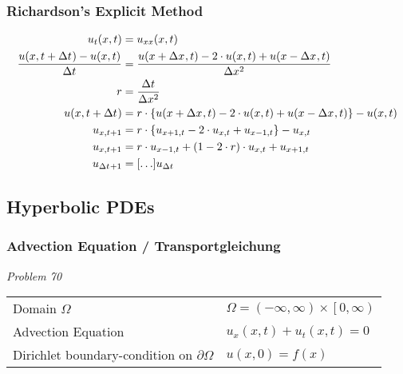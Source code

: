 \documentclass[
	final,
	a4paper,
	oneside,
	parskip=full,
	headings=standardclasses,
	headings=big,
	pointednumbers,
    fleqn
]{scrartcl}
\newcommand{\f}[2]{\frac{#1}{#2}}
\newcommand{\kl}[1]{{\left( #1 \right)}}
\newcommand{\kq}[1]{{\left\{ #1 \right\}}}
\newcommand{\ks}[1]{{\left[ #1 \right]}}
\newcommand{\dom}{{\Omega}}
\newcommand{\bound}{{\partial \Omega}}
\begin{document}
    \subsubsection*{Richardson's Explicit Method}
    
    \begin{align*}
        u_{t}\kl{x,t}                               & = u_{xx}\kl{x,t} \\
        \f{u \kl{x, t + \dt} - u \kl{x, t}}{\dt}    & = \f{u \kl{x + \dx, t} - 2 \cdot u\kl{x, t} + u \kl{x - \dx, t}}{\dx[2]} \\
        r                                           & = \f{\dt}{\dx[2]} \\
        u \kl{x, t + \dt}                           & = r \cdot \kq{u \kl{x + \dx, t} - 2 \cdot u\kl{x, t} + u \kl{x - \dx, t}} - u \kl{x, t} \\
        u_{x,t+1}                                   & = r \cdot \kq{u_{x+1,t} - 2 \cdot u_{x,t} + u_{x-1,t}} - u_{x, t} \\
        u_{x,t+1}                                   & = r \cdot u_{x-1,t} + \kl{1 - 2\cdot r} \cdot u_{x,t} + u_{x+1,t} \\
        u_{\dt + 1} & = \ks{\ldots}  u_{\dt}
    \end{align*}


    \newpage

    \subsection*{Hyperbolic PDEs}
    \subsubsection*{Advection Equation / Transportgleichung}
    
    {\it{Problem 70}} \\
    \begin{tabular}{p{5cm}l}
        Domain $\dom$                 & $\Omega = \kl{-\infty, \infty} \times \left[ 0, \infty \right)$ \\
        Advection Equation              & $u_x\kl{x,t} + u_t\kl{x,t} = 0$ \\
        Dirichlet boundary-condition on $\bound$    & $u\kl{x,0} = f\kl{x}$
    \end{tabular}
\end{document}
